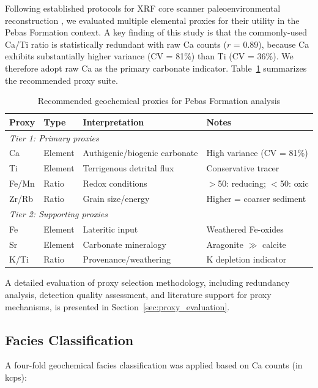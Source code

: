 \documentclass[11pt,a4paper]{article}
\newcommand{\FeMn}{Fe/Mn}
\newcommand{\KTi}{K/Ti}
\newcommand{\ZrRb}{Zr/Rb}
\begin{document}
Following established protocols for XRF core scanner paleoenvironmental reconstruction \citep{Croudace2015, Rothwell2015}, we evaluated multiple elemental proxies for their utility in the Pebas Formation context. A key finding of this study is that the commonly-used Ca/Ti ratio is statistically redundant with raw Ca counts ($r$ = 0.89), because Ca exhibits substantially higher variance (CV = 81\%) than Ti (CV = 36\%). We therefore adopt raw Ca as the primary carbonate indicator. Table~\ref{tab:proxies} summarizes the recommended proxy suite.

\begin{table}[h]
\centering
\caption{Recommended geochemical proxies for Pebas Formation analysis}
\label{tab:proxies}
\begin{tabular}{llll}
\toprule
Proxy & Type & Interpretation & Notes \\
\midrule
\multicolumn{4}{l}{\textit{Tier 1: Primary proxies}} \\
Ca & Element & Authigenic/biogenic carbonate & High variance (CV = 81\%) \\
Ti & Element & Terrigenous detrital flux & Conservative tracer \\
\FeMn{} & Ratio & Redox conditions & $>$50: reducing; $<$50: oxic \\
\ZrRb{} & Ratio & Grain size/energy & Higher = coarser sediment \\
\midrule
\multicolumn{4}{l}{\textit{Tier 2: Supporting proxies}} \\
Fe & Element & Lateritic input & Weathered Fe-oxides \\
Sr & Element & Carbonate mineralogy & Aragonite $\gg$ calcite \\
\KTi{} & Ratio & Provenance/weathering & K depletion indicator \\
\bottomrule
\end{tabular}
\end{table}

A detailed evaluation of proxy selection methodology, including redundancy analysis, detection quality assessment, and literature support for proxy mechanisms, is presented in Section~\ref{sec:proxy_evaluation}.

\subsection{Facies Classification}

A four-fold geochemical facies classification was applied based on Ca counts (in kcps):
\end{document}
